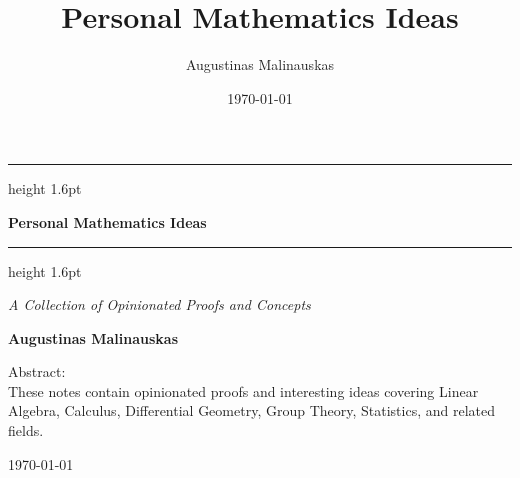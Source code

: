 \documentclass[12pt,oneside]{book}
\title{Personal Mathematics Ideas}
\author{Augustinas Malinauskas}
\date{\today} %
\theoremstyle{plain}
\theoremstyle{definition}
\theoremstyle{remark}
\begin{document}
\begin{titlepage}
  \centering
  \vspace*{2cm}

  \hrule height 1.6pt \vspace{0.5cm}
  {\Huge\bfseries Personal Mathematics Ideas\par}
  \vspace{0.5cm}
  \hrule height 1.6pt

  \vspace{1.5cm}
  {\Large\itshape A Collection of Opinionated Proofs and Concepts\par}

  \vspace{2.5cm}

  {\Large\textbf{Augustinas Malinauskas}\par}

  \vfill

  \begin{minipage}{0.8\textwidth}
    \centering
    \small
    Abstract:\\
    These notes contain opinionated proofs and interesting ideas covering Linear Algebra, Calculus, Differential Geometry, Group Theory, Statistics, and related fields.
  \end{minipage}

  \vfill

  {\large \today\par}
\end{titlepage}

\frontmatter
\tableofcontents

\mainmatter









\backmatter
\end{document}

